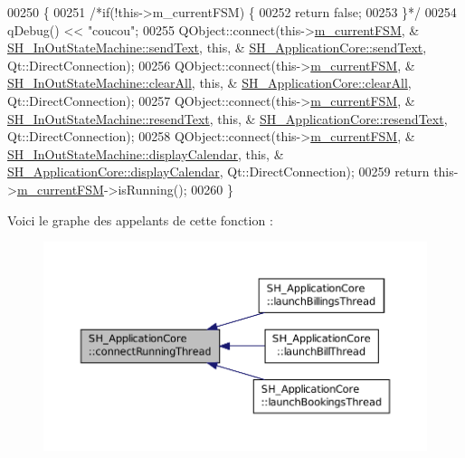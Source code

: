 \begin{DoxyCode}
00250 \{
00251     \textcolor{comment}{/*if(!this->m\_currentFSM) \{}
00252 \textcolor{comment}{        return false;}
00253 \textcolor{comment}{    \}*/}
00254     qDebug() << \textcolor{stringliteral}{"coucou"};
00255     QObject::connect(this->\hyperlink{classSH__ApplicationCore_a1088f3ba13abb8b3989cc0c325524232}{m\_currentFSM}, &
      \hyperlink{classSH__InOutStateMachine_ae2cbbe3cd207158668dcb4838938c7ad}{SH\_InOutStateMachine::sendText}, \textcolor{keyword}{this}, &
      \hyperlink{classSH__ApplicationCore_ac70121669e6133e84b0b8266b09b9199}{SH\_ApplicationCore::sendText}, Qt::DirectConnection);
00256         QObject::connect(this->\hyperlink{classSH__ApplicationCore_a1088f3ba13abb8b3989cc0c325524232}{m\_currentFSM}, &
      \hyperlink{classSH__InOutStateMachine_ad722deb53285919796b04db5af6e51b4}{SH\_InOutStateMachine::clearAll}, \textcolor{keyword}{this}, &
      \hyperlink{classSH__ApplicationCore_a5f60ca485028cf56d9d56f7e80685f10}{SH\_ApplicationCore::clearAll}, Qt::DirectConnection);
00257         QObject::connect(this->\hyperlink{classSH__ApplicationCore_a1088f3ba13abb8b3989cc0c325524232}{m\_currentFSM}, &
      \hyperlink{classSH__InOutStateMachine_a526822c66b46aa0cd81ba4473fa5573f}{SH\_InOutStateMachine::resendText}, \textcolor{keyword}{this}, &
      \hyperlink{classSH__ApplicationCore_a5eb6c04758ff47330a8249da2b3265f2}{SH\_ApplicationCore::resendText}, Qt::DirectConnection);
00258     QObject::connect(this->\hyperlink{classSH__ApplicationCore_a1088f3ba13abb8b3989cc0c325524232}{m\_currentFSM}, &
      \hyperlink{classSH__InOutStateMachine_a0d241868828cbf9798233a8c74c69851}{SH\_InOutStateMachine::displayCalendar}, \textcolor{keyword}{this}, &
      \hyperlink{classSH__ApplicationCore_a7236456c901a089ca6e5735ec7e5da03}{SH\_ApplicationCore::displayCalendar}, Qt::DirectConnection);
00259     \textcolor{keywordflow}{return} this->\hyperlink{classSH__ApplicationCore_a1088f3ba13abb8b3989cc0c325524232}{m\_currentFSM}->isRunning();
00260 \}
\end{DoxyCode}


Voici le graphe des appelants de cette fonction \-:\nopagebreak
\begin{figure}[H]
\begin{center}
\leavevmode
\includegraphics[width=350pt]{classSH__ApplicationCore_a3a10c2d662707140340d7a827d119c8d_icgraph}
\end{center}
\end{figure}


